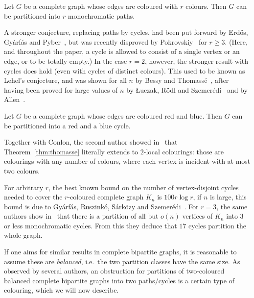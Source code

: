 \documentclass[a4paper,10pt]{article}
\begin{document}
\begin{conjecture}\label{con:gyarfas}
Let $G$ be a complete graph whose edges are coloured with $r$ colours.
Then $G$ can be partitioned into $r$ monochromatic paths.
\end{conjecture}

A stronger conjecture, replacing paths by cycles, had been put forward by Erd\H os, Gy\'arf\'as and Pyber~\cite{EGP91}, but was recently disproved by Pokrovskiy~\cite{Pok14} for $r\geq 3$. 
(Here, and throughout the paper, a cycle is allowed to consist of a single vertex or an edge, or to be totally empty.)
In the case $r=2$, however, the stronger result with cycles does hold (even with cycles of distinct colours). 
This used to be known as Lehel's conjecture, and was shown for all $n$ by Bessy and Thomass\'e~\cite{BT10}, after having been proved for large values of $n$ by \L uczak, R\"odl and Szemer\'edi~\cite{LRS98} and by Allen~\cite{A08}.

\begin{theorem}\label{thm:thomasse}
Let $G$ be a complete graph whose edges are coloured red and blue.
Then $G$ can be partitioned into a red and a blue cycle.
\end{theorem}

Together with Conlon, the second author showed in~\cite{CS14} that Theorem~\ref{thm:thomasse} literally extends to $2$-local colourings: 
those are colourings with any number of colours, where each vertex is incident with at most two colours.

For arbitrary $r$, the best known bound on the number of vertex-disjoint cycles needed to cover the $r$-coloured complete graph $K_n$ is $100r\log r$,  if $n$ is large, this bound is due to Gy\'arf\'as, Ruszink\'o, S\'ark\"ozy and Szemer\'edi~\cite{GRSS06}.
  For $r=3$, the same authors show in~\cite{GRSS11} that  there is a partition of all but $o(n)$ vertices of $K_{n}$ into 3 or less monochromatic cycles. From this they deduce that  $17$ cycles partition the whole graph. 

\medskip

If one aims for similar results in complete bipartite graphs, it is reasonable to assume these are \emph{balanced}, i.e.~the two partition classes have the same size.
As observed by several authors, an obstruction for partitions of two-coloured balanced complete bipartite graphs into two paths/cycles is a certain type of colouring, which we will now describe. 
\end{document}
